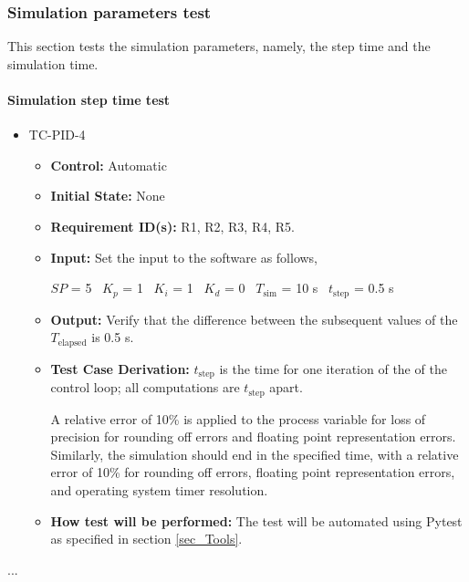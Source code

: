 \documentclass[12pt, titlepage]{article}
\begin{document}
\subsubsection{Simulation parameters test}
This section tests the simulation parameters, namely, the step time and the simulation time.

\paragraph{Simulation step time test}

\begin{itemize}
\item{TC-PID-4\\}
\begin{itemize}

\item{\textbf{Control:}} Automatic
					
\item{\textbf{Initial State:}} None

\item{\textbf{Requirement ID(s):}}  R1, R2, R3, R4, R5.
					
\item{\textbf{Input:}} Set the input to the software as follows,

$SP$ = 5
~\newline$K_p$ = 1
~\newline$K_i$ = 1
~\newline$K_d$ = 0
~\newline$T_\text{sim}$ = 10 s
~\newline$t_\text{step}$ = 0.5 s
					
\item{\textbf{Output:}}  Verify that the difference between the subsequent values of the 
$T_\text{elapsed}$ is 0.5 s.

\item{\textbf{Test Case Derivation:}}  $t_\text{step}$ is the time for one iteration of the of the
control loop; all computations are $t_\text{step}$ apart.

A relative error of 10\% is applied to the process variable for loss
of precision for rounding off errors and floating point representation
errors. Similarly, the simulation should end in the specified time, with a 
relative error of 10\% for rounding off errors, floating point 
representation errors, and operating system timer resolution.


\item{\textbf{How test will be performed:}}  The test will be automated using Pytest as specified in 
section \ref{sec_Tools}.

\end{itemize}
\end{itemize}
...
\end{document}
